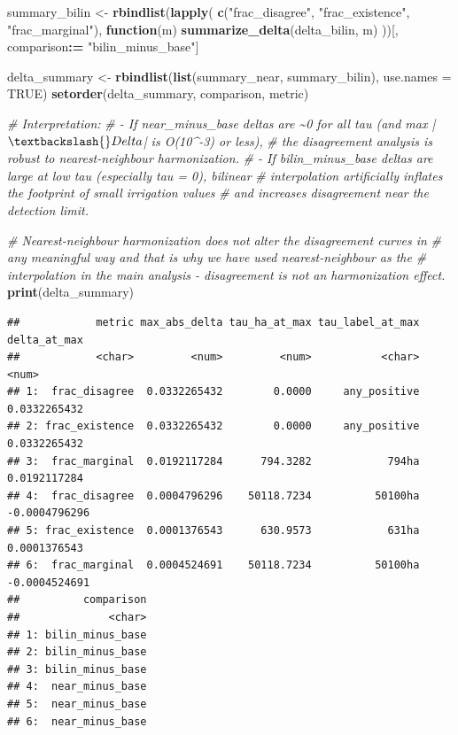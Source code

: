 \documentclass[
  11pt,
]{article}
\newenvironment{Shaded}{\begin{snugshade}}{\end{snugshade}}
\newcommand{\AttributeTok}[1]{\textcolor[rgb]{0.13,0.29,0.53}{#1}}
\newcommand{\CommentTok}[1]{\textcolor[rgb]{0.56,0.35,0.01}{\textit{#1}}}
\newcommand{\ConstantTok}[1]{\textcolor[rgb]{0.56,0.35,0.01}{#1}}
\newcommand{\ControlFlowTok}[1]{\textcolor[rgb]{0.13,0.29,0.53}{\textbf{#1}}}
\newcommand{\FunctionTok}[1]{\textcolor[rgb]{0.13,0.29,0.53}{\textbf{#1}}}
\newcommand{\NormalTok}[1]{#1}
\newcommand{\OtherTok}[1]{\textcolor[rgb]{0.56,0.35,0.01}{#1}}
\newcommand{\SpecialCharTok}[1]{\textcolor[rgb]{0.81,0.36,0.00}{\textbf{#1}}}
\newcommand{\StringTok}[1]{\textcolor[rgb]{0.31,0.60,0.02}{#1}}
\begin{document}
\begin{Shaded}
\begin{Highlighting}[]
\NormalTok{summary\_bilin }\OtherTok{\textless{}{-}} \FunctionTok{rbindlist}\NormalTok{(}\FunctionTok{lapply}\NormalTok{(}
  \FunctionTok{c}\NormalTok{(}\StringTok{"frac\_disagree"}\NormalTok{, }\StringTok{"frac\_existence"}\NormalTok{, }\StringTok{"frac\_marginal"}\NormalTok{),}
  \ControlFlowTok{function}\NormalTok{(m) }\FunctionTok{summarize\_delta}\NormalTok{(delta\_bilin, m)}
\NormalTok{))[, comparison}\SpecialCharTok{:=} \StringTok{"bilin\_minus\_base"}\NormalTok{]}

\NormalTok{delta\_summary }\OtherTok{\textless{}{-}} \FunctionTok{rbindlist}\NormalTok{(}\FunctionTok{list}\NormalTok{(summary\_near, summary\_bilin), }\AttributeTok{use.names =} \ConstantTok{TRUE}\NormalTok{)}
\FunctionTok{setorder}\NormalTok{(delta\_summary, comparison, metric)}

\CommentTok{\# Interpretation:}
\CommentTok{\#   {-} If near\_minus\_base deltas are \textasciitilde{}0 for all tau (and max |$\textbackslash{}Delta$| is O(10\^{}{-}3) or less),}
\CommentTok{\#     the disagreement analysis is robust to nearest{-}neighbour harmonization.}
\CommentTok{\#   {-} If bilin\_minus\_base deltas are large at low tau (especially tau = 0), bilinear}
\CommentTok{\#     interpolation artificially inflates the footprint of small irrigation values}
\CommentTok{\#     and increases disagreement near the detection limit.}

\CommentTok{\# Nearest{-}neighbour harmonization does not alter the disagreement curves in }
\CommentTok{\# any meaningful way and that is why we have used nearest{-}neighbour as the }
\CommentTok{\# interpolation in the main analysis {-} disagreement is not an harmonization effect.}
\FunctionTok{print}\NormalTok{(delta\_summary)}
\end{Highlighting}
\end{Shaded}

\begin{verbatim}
##            metric max_abs_delta tau_ha_at_max tau_label_at_max  delta_at_max
##            <char>         <num>         <num>           <char>         <num>
## 1:  frac_disagree  0.0332265432        0.0000     any_positive  0.0332265432
## 2: frac_existence  0.0332265432        0.0000     any_positive  0.0332265432
## 3:  frac_marginal  0.0192117284      794.3282            794ha  0.0192117284
## 4:  frac_disagree  0.0004796296    50118.7234          50100ha -0.0004796296
## 5: frac_existence  0.0001376543      630.9573            631ha  0.0001376543
## 6:  frac_marginal  0.0004524691    50118.7234          50100ha -0.0004524691
##          comparison
##              <char>
## 1: bilin_minus_base
## 2: bilin_minus_base
## 3: bilin_minus_base
## 4:  near_minus_base
## 5:  near_minus_base
## 6:  near_minus_base
\end{verbatim}
\end{document}
